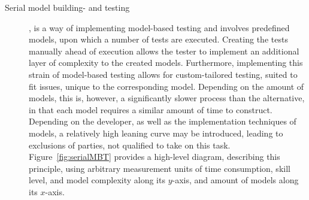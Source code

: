 \begin{description}
  \item[Serial model building- and testing],
  is a way of implementing model-based testing and involves predefined models, upon which a number of tests are executed. Creating the tests manually ahead of execution allows the tester to implement an additional layer of complexity to the created models. Furthermore, implementing this strain of model-based testing allows for custom-tailored testing, suited to fit issues, unique to the corresponding model. Depending on the amount of models, this is, however, a significantly slower process than the alternative, in that each model requires a similar amount of time to construct. Depending on the developer, as well as the implementation techniques of models, a relatively high leaning curve may be introduced, leading to exclusions of parties, not qualified to take on this task. 
  Figure~\ref{fig:serialMBT} provides a high-level diagram, describing this principle, using arbitrary measurement units of time consumption, skill level, and model complexity along its $y$-axis, and amount of models along its $x$-axis. \newpage
  \begin{figure}[h]
    \centering
\end{figure}
\end{description}
